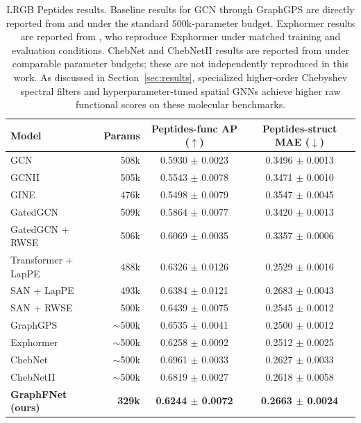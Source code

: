 \documentclass[10pt]{article}
\begin{document}
\begin{table}[t]
\caption{LRGB Peptides results. Baseline results for GCN through GraphGPS are directly reported from \citet{dwivedi2022long} and \citet{rampasek2022recipe} under the standard 500k-parameter budget. Exphormer results are reported from \citet{wang2024graphmamba}, who reproduce Exphormer \citep{shirzad2023exphormer} under matched training and evaluation conditions. ChebNet and ChebNetII results are reported from \citet{hariri2025returnchebnetunderstandingimproving} under comparable parameter budgets; these are not independently reproduced in this work. As discussed in Section~\ref{sec:results}, specialized higher-order Chebyshev spectral filters \citep{hariri2025returnchebnetunderstandingimproving} and hyperparameter-tuned spatial GNNs \citep{tonshoff2024where} achieve higher raw functional scores on these molecular benchmarks.}
\label{tab:main}
\centering
\begin{tabular}{lrcc}
\toprule
\textbf{Model} & \textbf{Params} & \textbf{Peptides-func AP} ($\uparrow$) & \textbf{Peptides-struct MAE} ($\downarrow$) \\
\midrule
GCN                  & 508k & 0.5930 $\pm$ 0.0023 & 0.3496 $\pm$ 0.0013 \\
GCNII                & 505k & 0.5543 $\pm$ 0.0078 & 0.3471 $\pm$ 0.0010 \\
GINE                 & 476k & 0.5498 $\pm$ 0.0079 & 0.3547 $\pm$ 0.0045 \\
GatedGCN             & 509k & 0.5864 $\pm$ 0.0077 & 0.3420 $\pm$ 0.0013 \\
GatedGCN + RWSE      & 506k & 0.6069 $\pm$ 0.0035 & 0.3357 $\pm$ 0.0006 \\
Transformer + LapPE  & 488k & 0.6326 $\pm$ 0.0126 & 0.2529 $\pm$ 0.0016 \\
SAN + LapPE          & 493k & 0.6384 $\pm$ 0.0121 & 0.2683 $\pm$ 0.0043 \\
SAN + RWSE           & 500k & 0.6439 $\pm$ 0.0075 & 0.2545 $\pm$ 0.0012 \\
GraphGPS \citep{rampasek2022recipe} & $\sim$500k & 0.6535 $\pm$ 0.0041 & 0.2500 $\pm$ 0.0012 \\
Exphormer \citep{shirzad2023exphormer} & $\sim$500k & 0.6258 $\pm$ 0.0092 & 0.2512 $\pm$ 0.0025 \\
\midrule
ChebNet \citep{hariri2025returnchebnetunderstandingimproving}     & $\sim$500k   & 0.6961 $\pm$ 0.0033 & 0.2627 $\pm$ 0.0033 \\
ChebNetII \citep{hariri2025returnchebnetunderstandingimproving}   & $\sim$500k   & 0.6819 $\pm$ 0.0027 & 0.2618 $\pm$ 0.0058 \\
\midrule
\textbf{GraphFNet (ours)} & \textbf{329k} & \textbf{0.6244 $\pm$ 0.0072} & \textbf{0.2663 $\pm$ 0.0024} \\
\bottomrule
\end{tabular}
\end{table}
\end{document}

